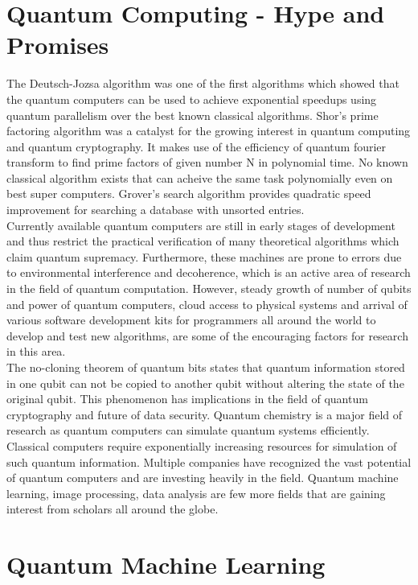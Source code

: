 \documentclass[english,a4paper,11pt,oneside,onecolumn]{book}
\begin{document}
\section{Quantum Computing - Hype and Promises}
\label{sec:qHype}
The Deutsch-Jozsa algorithm was one of the first algorithms which showed that the quantum computers can be used to achieve exponential speedups using quantum parallelism over the best known classical algorithms. Shor's prime factoring algorithm was a catalyst for the growing interest in quantum computing and quantum cryptography. It makes use of the efficiency of quantum fourier transform to find prime factors of given number N in polynomial time. No known classical algorithm exists that can acheive the same task polynomially even on best super computers. Grover's search algorithm provides quadratic speed improvement for searching a database with unsorted entries.\\

\noindent Currently available quantum computers are still in early stages of development and thus restrict the practical verification of many theoretical algorithms which claim quantum supremacy. Furthermore, these machines are prone to errors due to environmental interference and decoherence, which is an active area of research in the field of quantum computation. However, steady growth of number of qubits and power of quantum computers, cloud access to physical systems and arrival of various software development kits for programmers all around the world to develop and test new algorithms, are some of the encouraging factors for research in this area.\\

\noindent The no-cloning theorem of quantum bits states that quantum information stored in one qubit can not be copied to another qubit without altering the state of the original qubit. This phenomenon has implications in the field of quantum cryptography and future of data security. Quantum chemistry is a major field of research as quantum computers can simulate quantum systems efficiently. Classical computers require exponentially increasing resources for simulation of such quantum information. Multiple companies have recognized the vast potential of quantum computers and are investing heavily in the field. Quantum machine learning, image processing, data analysis are few more fields that are gaining interest from scholars all around the globe.

\section{Quantum Machine Learning}
\label{sec:qml}
\end{document}
